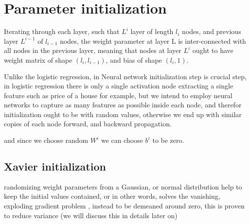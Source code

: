 \documentclass[4apaper,12pt]{book}
\begin{document}
\section{Parameter initialization}
\begin{description}
\item Iterating through each layer, such that $L^i$ layer of length $l_i$ nodes, and previous layer $L^{i-1}$ of $l_{i-1}$ nodes, the weight parameter at layer L is inter-connected with all nodes in the previous layer, meaning that nodes at layer $L^i$ ought to have weight matrix of shape $(l_i, l_{i-1})$, and bias of shape $(l_i,1)$.
\item Unlike the logistic regression, in Neural network initialization step is crucial step, in logistic regression there is only a single activation node extracting a single feature such as price of a house for example, but we intend to employ neural networks to capture as many features as possible inside each node, and therefor initialization ought to be with random values, otherwise we end up with similar copies of each node forward, and backward propagation.
\item and since we choose random $W^i$ we can choose $b^i$ to be zero.
  \subsection{Xavier initialization}
  \begin{description}
  \item randomizing weight parameters from a Gaussian, or normal distribution help to keep the initial values contained, or in other words, solves the vanishing, exploding gradient problem , instead to be demeaned around zero, this is proven to reduce variance (we will discuss this in details later on)
    \end{description}
\end{description}
\end{document}
